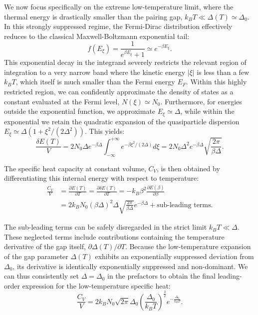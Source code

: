 We now focus specifically on the extreme low-temperature limit, where the thermal energy is drastically smaller than the pairing gap, \( k_B T \ll \Delta(T) \simeq \Delta_0 \). In this strongly suppressed regime, the Fermi-Dirac distribution effectively reduces to the classical Maxwell-Boltzmann exponential tail:
\[
    f(E_\xi) = \frac{1}{e^{\beta E_\xi} + 1} \simeq e^{-\beta E_\xi}.
\]
This exponential decay in the integrand severely restricts the relevant region of integration to a very narrow band where the kinetic energy \( |\xi| \) is less than a few \( k_B T \), which itself is much smaller than the Fermi energy \( E_F \). Within this highly restricted region, we can confidently approximate the density of states as a constant evaluated at the Fermi level, \( N(\xi) \simeq N_0 \). Furthermore, for energies outside the exponential function, we approximate \( E_\xi \simeq \Delta \), while within the exponential we retain the quadratic expansion of the quasiparticle dispersion \( E_\xi \simeq \Delta(1 + \xi^2/(2\Delta^2)) \). This yields:
\[
    \frac{\delta E(T)}{V} = 2N_0 \Delta e^{-\beta\Delta} \int_{-\infty}^{+\infty} e^{-\beta\xi^2/(2\Delta)} d\xi = 2N_0 \Delta^2 e^{-\beta\Delta} \sqrt{\frac{2\pi}{\beta\Delta}}.
\]

The specific heat capacity at constant volume, \( C_V \), is then obtained by differentiating this internal energy with respect to temperature:
\[
    \begin{aligned}
        \frac{C_V}{V} & = \frac{\partial E(T)}{\partial T} = \frac{\partial \delta E(T)}{\partial T} = -k_B \beta^2 \frac{\partial E(\beta)}{\partial \beta} \\
                      & = 2k_B N_0 (\beta\Delta)^2 \Delta \sqrt{\frac{2\pi}{\beta\Delta}} e^{-\beta\Delta} + \text{sub-leading terms}.
    \end{aligned}
\]


The sub-leading terms can be safely disregarded in the strict limit \( k_B T \ll \Delta \). These neglected terms include contributions containing the temperature derivative of the gap itself, \( \partial\Delta(T)/\partial T \). Because the low-temperature expansion of the gap parameter \( \Delta(T) \) exhibits an exponentially suppressed deviation from \( \Delta_0 \), its derivative is identically exponentially suppressed and non-dominant. We can thus consistently set \( \Delta = \Delta_0 \) in the prefactors to obtain the final leading-order expression for the low-temperature specific heat:
\begin{equation} \label{eq:bcs_specific_heat}
    \frac{C_V}{V} = 2k_B N_0 \sqrt{2\pi} \Delta_0 \left( \frac{\Delta_0}{k_B T} \right)^{\frac{3}{2}} e^{-\frac{\Delta_0}{k_B T}}.
\end{equation}

